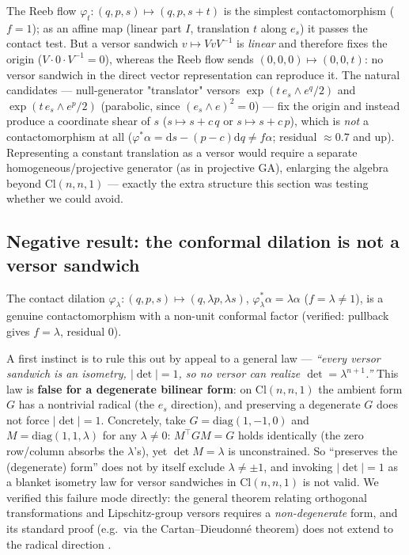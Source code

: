\documentclass[11pt]{article}
\newcommand{\Cl}{\mathrm{Cl}}
\newcommand{\dif}{\mathrm{d}}
\begin{document}
The Reeb flow $\varphi_t:(q,p,s)\mapsto(q,p,s+t)$ is the simplest contactomorphism ($f=1$); as an affine map (linear part $I$, translation $t$ along $e_s$) it passes the contact test. But a versor sandwich $v\mapsto Vv V^{-1}$ is \emph{linear} and therefore fixes the origin ($V\cdot 0\cdot V^{-1}=0$), whereas the Reeb flow sends $(0,0,0)\mapsto(0,0,t)$: no versor sandwich in the direct vector representation can reproduce it. The natural candidates — null-generator "translator" versors $\exp(t\,e_s\wedge e^q/2)$ and $\exp(t\,e_s\wedge e^p/2)$ (parabolic, since $(e_s\wedge e)^2=0$) — fix the origin and instead produce a coordinate shear of $s$ ($s\mapsto s+c\,q$ or $s\mapsto s+c\,p$), which is \emph{not} a contactomorphism at all ($\varphi^*\alpha = \dif s - (p-c)\dif q\ne f\alpha$; residual $\approx0.7$ and up). Representing a constant translation as a versor would require a separate homogeneous/projective generator (as in projective GA), enlarging the algebra beyond $\Cl(n,n,1)$ — exactly the extra structure this section was testing whether we could avoid.

\subsection{Negative result: the conformal dilation is not a versor sandwich}
\label{sec:dilation-negative}

The contact dilation $\varphi_\lambda:(q,p,s)\mapsto(q,\lambda p,\lambda s)$, $\varphi_\lambda^*\alpha=\lambda\alpha$ ($f=\lambda\ne1$), is a genuine contactomorphism with a non-unit conformal factor (verified: pullback gives $f=\lambda$, residual $0$).

A first instinct is to rule this out by appeal to a general law — \emph{``every versor sandwich is an isometry, $|\det|=1$, so no versor can realize $\det=\lambda^{n+1}$.''} This law is \textbf{false for a degenerate bilinear form}: on $\Cl(n,n,1)$ the ambient form $G$ has a nontrivial radical (the $e_s$ direction), and preserving a degenerate $G$ does not force $|\det|=1$. Concretely, take $G=\mathrm{diag}(1,-1,0)$ and $M=\mathrm{diag}(1,1,\lambda)$ for any $\lambda\ne0$: $M^\top G M = G$ holds identically (the zero row/column absorbs the $\lambda$'s), yet $\det M=\lambda$ is unconstrained. So ``preserves the (degenerate) form'' does not by itself exclude $\lambda\ne\pm1$, and invoking $|\det|=1$ as a blanket isometry law for versor sandwiches in $\Cl(n,n,1)$ is not valid. We verified this failure mode directly: the general theorem relating orthogonal transformations and Lipschitz-group versors requires a \emph{non-degenerate} form, and its standard proof (e.g.\ via the Cartan--Dieudonné theorem) does not extend to the radical direction \cite{filimoshina2023degenerate}.
\end{document}
